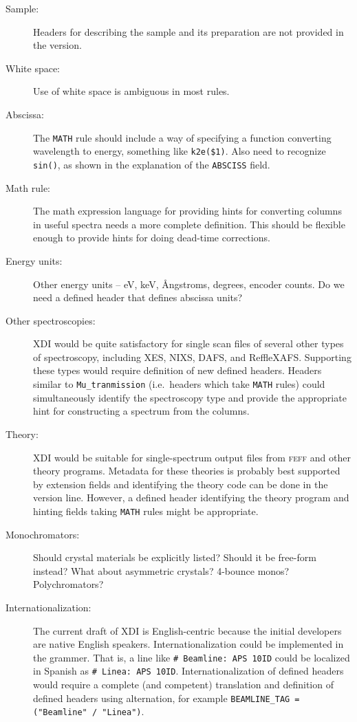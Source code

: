 \documentclass{article}
\newcommand{\xdi}{\textsf{XDI}}
\begin{document}
\begin{description}
\item[Sample:] Headers for describing the sample and its preparation
  are not provided in the version.
\item[White space:] Use of white space is ambiguous in most rules.
\item[Abscissa:] The \texttt{MATH} rule should include a way of
  specifying a function converting wavelength to energy, something
  like \texttt{k2e(\$1)}.  Also need to recognize \texttt{sin()}, as
  shown in the explanation of the \texttt{ABSCISS}
  field.\label{anchor:math}
\item[Math rule:] The math expression language for providing hints for
  converting columns in useful spectra needs a more complete
  definition.  This should be flexible enough to provide hints for
  doing dead-time corrections.
\item[Energy units:] Other energy units -- eV, keV, {\AA}ngstroms,
  degrees, encoder counts.  Do we need a defined header that defines
  abscissa units?\label{anchor:units}
\item[Other spectroscopies:] {\xdi} would be quite satisfactory for
  single scan files of several other types of spectroscopy, including
  XES, NIXS, DAFS, and ReffleXAFS.  Supporting these types would
  require definition of new defined headers.  Headers similar to
  \texttt{Mu\_tranmission} (i.e.\ headers which take \texttt{MATH}
  rules) could simultaneously identify the spectroscopy type and
  provide the appropriate hint for constructing a spectrum from the
  columns.
\item[Theory:] {\xdi} would be suitable for single-spectrum output
  files from \textsc{feff} and other theory programs.  Metadata for
  these theories is probably best supported by extension fields and
  identifying the theory code can be done in the version line.
  However, a defined header identifying the theory program and hinting
  fields taking \texttt{MATH} rules might be appropriate.
\item[Monochromators:] Should crystal materials be explicitly listed?
  Should it be free-form instead?  What about asymmetric crystals?
  4-bounce monos?  Polychromators?\label{anchor:mono}
\item[Internationalization:] The current draft of {\xdi} is
  English-centric because the initial developers are native English
  speakers.  Internationalization could be implemented in the grammer.
  That is, a line like \texttt{\# Beamline:\ APS 10ID} could be
  localized in Spanish as \texttt{\# Linea:\ APS 10ID}.
  Internationalization of defined headers would require a complete
  (and competent) translation and definition of defined headers using
  alternation, for example \texttt{BEAMLINE\_TAG = ("Beamline" / "Linea")}.


\end{description}
\end{document}
